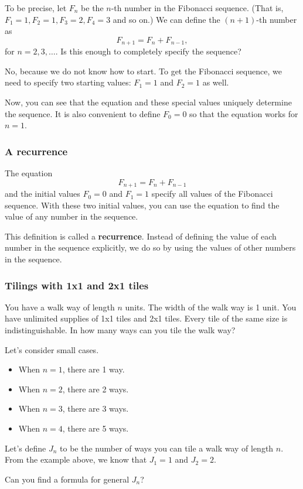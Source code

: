 \begin{frame}
  To be precise, let $F_n$ be the $n$-th number in the Fibonacci
  sequence. (That is, $F_1=1, F_2=1, F_3=2, F_4=3$ and so on.)  We can
  define the $(n+1)$-th number as
  \[
  F_{n+1}=F_n+F_{n-1},
  \]
  for $n=2,3,\ldots$.
  \pause
  Is this enough to completely specify the sequence? \pause

  No, because we do not know how to start.  To get the Fibonacci
  sequence, we need to specify two starting values: $F_1=1$ and
  $F_2=1$ as well.

  Now, you can see that the equation and these special values uniquely
  determine the sequence.  It is also convenient to define $F_0=0$ so
  that the equation works for $n=1$.
\end{frame}

\begin{frame}\frametitle{A recurrence}
  The equation
  \[ F_{n+1}=F_n+F_{n-1} \]
  and the initial values $F_0=0$ and $F_1=1$ specify all values of the
  Fibonacci sequence.  With these two initial values, you can use the
  equation to find the value of any number in the sequence.

  This definition is called a {\bf recurrence}.  Instead of defining
  the value of each number in the sequence explicitly, we do so by
  using the values of other numbers in the sequence.
\end{frame}

\begin{frame}\frametitle{Tilings with 1x1 and 2x1 tiles}
  You have a walk way of length $n$ units.  The width of the walk way
  is 1 unit.  You have unlimited supplies of 1x1 tiles and 2x1 tiles.
  Every tile of the same size is indistinguishable.  In how many ways
  can you tile the walk way?

  Let's consider small cases.
  \begin{itemize}
  \item When $n=1$, there are 1 way.
  \item When $n=2$, there are 2 ways.
  \item When $n=3$, there are 3 ways.
  \item When $n=4$, there are 5 ways.
  \end{itemize}

  Let's define $J_n$ to be the number of ways you can tile a walk way
  of length $n$.  From the example above, we know that $J_1=1$ and $J_2=2$.

  Can you find a formula for general $J_n$?
\end{frame}

